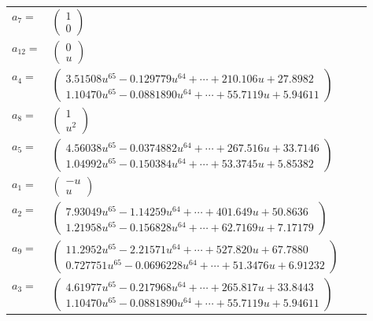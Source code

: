 \documentclass[1p]{elsarticle_modified}
\theoremstyle{definition}
\begin{document}
\begin{tabular}{m{7pt} m{180pt} m{7pt} m{180pt} }
\flushright $a_{7}=$&$\begin{pmatrix}1\\0\end{pmatrix}$ \\
\flushright $a_{12}=$&$\begin{pmatrix}0\\u\end{pmatrix}$ \\
\flushright $a_{4}=$&$\begin{pmatrix}3.51508 u^{65}-0.129779 u^{64}+\cdots+210.106 u+27.8982\\1.10470 u^{65}-0.0881890 u^{64}+\cdots+55.7119 u+5.94611\end{pmatrix}$ \\
\flushright $a_{8}=$&$\begin{pmatrix}1\\u^2\end{pmatrix}$ \\
\flushright $a_{5}=$&$\begin{pmatrix}4.56038 u^{65}-0.0374882 u^{64}+\cdots+267.516 u+33.7146\\1.04992 u^{65}-0.150384 u^{64}+\cdots+53.3745 u+5.85382\end{pmatrix}$ \\
\flushright $a_{1}=$&$\begin{pmatrix}- u\\u\end{pmatrix}$ \\
\flushright $a_{2}=$&$\begin{pmatrix}7.93049 u^{65}-1.14259 u^{64}+\cdots+401.649 u+50.8636\\1.21958 u^{65}-0.156828 u^{64}+\cdots+62.7169 u+7.17179\end{pmatrix}$ \\
\flushright $a_{9}=$&$\begin{pmatrix}11.2952 u^{65}-2.21571 u^{64}+\cdots+527.820 u+67.7880\\0.727751 u^{65}-0.0696228 u^{64}+\cdots+51.3476 u+6.91232\end{pmatrix}$ \\
\flushright $a_{3}=$&$\begin{pmatrix}4.61977 u^{65}-0.217968 u^{64}+\cdots+265.817 u+33.8443\\1.10470 u^{65}-0.0881890 u^{64}+\cdots+55.7119 u+5.94611\end{pmatrix}$ \\

\end{tabular}
\end{document}
